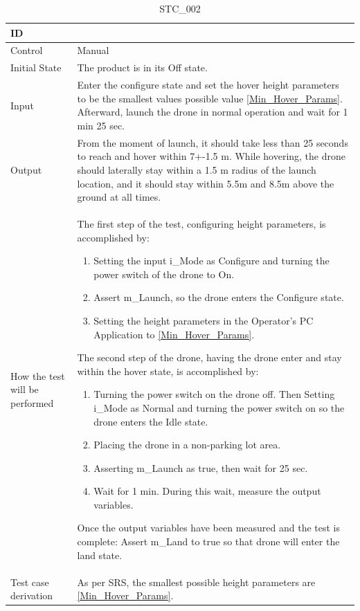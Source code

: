 \documentclass[12pt, titlepage]{article}
\begin{document}
\begin{table}[!h]
\begin{center}
\caption {STC\_002}
\label{tab:STC_002}
\begin{tabular}{ | m{1.5cm} | m{15cm} | } 
\hline
ID & \nameref{tab:STC_002} \\ 
\hline
Control & Manual \\ 
\hline
Initial State & The product is in its Off state. \\ 
\hline
Input & Enter the configure state and set the hover height parameters to be the smallest values possible value \ref{Min_Hover_Params}. Afterward, launch the drone in normal operation and wait for 1 min 25 sec. \\ 
\hline
Output & From the moment of launch, it should take less than 25 seconds to reach and hover within 7+-1.5 m. While hovering, the drone should laterally stay within a 1.5 m radius of the launch location, and it should stay within 5.5m and 8.5m above the ground at all times. \\ 
\hline
How the test will be performed & 
The first step of the test, configuring height parameters, is accomplished by:
\begin{enumerate}[topsep=0pt,itemsep=-1ex,partopsep=1ex,parsep=1ex]
    \item Setting the input i\_Mode as Configure and turning the power switch of the drone to On.
    \item Assert m\_Launch, so the drone enters the Configure state.
    \item Setting the height parameters in the Operator's PC Application to \ref{Min_Hover_Params}.
\end{enumerate}
The second step of the drone, having the drone enter and stay within the hover state, is accomplished by:
\begin{enumerate}[topsep=0pt,itemsep=-1ex,partopsep=1ex,parsep=1ex]
	\item Turning the power switch on the drone off. Then Setting i\_Mode as Normal and turning the power switch on so the drone enters the Idle state.
	\item Placing the drone in a non-parking lot area. 
	\item Asserting m\_Launch as true, then wait for 25 sec.
	\item Wait for 1 min. During this wait, measure the output variables.
\end{enumerate}
Once the output variables have been measured and the test is complete:
Assert m\_Land to true so that drone will enter the land state.\\ 
\hline
Test case derivation & As per SRS, the smallest possible height parameters are \ref{Min_Hover_Params}. 


\end{tabular}
\end{center}
\end{table}
\end{document}
